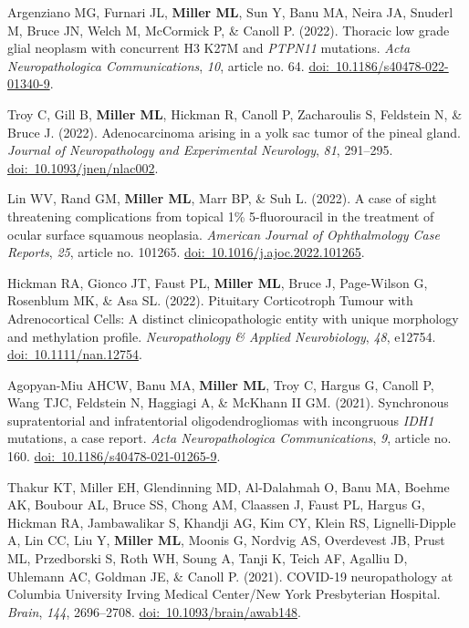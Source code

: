 \documentclass[10pt]{article}
\begin{document}
\begin{description}
\item Argenziano MG, Furnari JL, \textbf{Miller ML}, Sun Y, Banu MA, Neira JA, Snuderl M, Bruce JN, Welch M, McCormick P, \& Canoll P. (2022). Thoracic low grade glial neoplasm with concurrent H3 K27M and \textit{PTPN11} mutations. \textit{Acta Neuropathologica Communications}, \textit{10}, article no. 64. \href{https://doi.org/10.1186/s40478-022-01340-9}{doi:~10.1186/s40478-022-01340-9}.
\item Troy C, Gill B, \textbf{Miller ML}, Hickman R, Canoll P, Zacharoulis S, Feldstein N, \& Bruce J. (2022). Adenocarcinoma arising in a yolk sac tumor of the pineal gland. \textit{Journal of Neuropathology and Experimental Neurology}, \textit{81}, 291--295. \href{http://dx.doi.org/10.1093/jnen/nlac002}{doi:~10.1093/jnen/nlac002}.
\item Lin WV, Rand GM, \textbf{Miller ML}, Marr BP, \& Suh L. (2022). A case of sight threatening complications from topical 1\% 5-fluorouracil in the treatment of ocular surface squamous neoplasia. \textit{American Journal of Ophthalmology Case Reports}, \textit{25}, article no. 101265. \href{https://doi.org/10.1016/j.ajoc.2022.101265}{doi:~10.1016/j.ajoc.2022.101265}.
\item Hickman RA, Gionco JT, Faust PL, \textbf{Miller ML}, Bruce J, Page-Wilson G, Rosenblum MK, \& Asa SL. (2022). Pituitary Corticotroph Tumour with Adrenocortical Cells: A distinct clinicopathologic entity with unique morphology and methylation profile. \textit{Neuropathology \& Applied Neurobiology}, \textit{48}, e12754. \href{https://doi.org/10.1111/nan.12754}{doi:~10.1111/nan.12754}.
\item Agopyan-Miu AHCW, Banu MA, \textbf{Miller ML}, Troy C, Hargus G, Canoll P, Wang TJC, Feldstein N, Haggiagi A, \& McKhann II GM. (2021). Synchronous supratentorial and infratentorial oligodendrogliomas with incongruous \textit{IDH1} mutations, a case report. \textit{Acta Neuropathologica Communications}, \textit{9}, article no. 160. \href{https://doi.org/10.1186/s40478-021-01265-9}{doi:~10.1186/s40478-021-01265-9}.
\item Thakur KT, Miller EH, Glendinning MD, Al-Dalahmah O, Banu MA, Boehme AK, Boubour AL, Bruce SS, Chong AM, Claassen J, Faust PL, Hargus G, Hickman RA, Jambawalikar S, Khandji AG, Kim CY, Klein RS, Lignelli-Dipple A, Lin CC, Liu Y, \textbf{Miller ML}, Moonis G, Nordvig AS, Overdevest JB, Prust ML, Przedborski S, Roth WH, Soung A, Tanji K, Teich AF, Agalliu D, Uhlemann AC, Goldman JE, \& Canoll P. (2021). COVID-19 neuropathology at Columbia University Irving Medical Center/New York Presbyterian Hospital. \textit{Brain}, \textit{144}, 2696--2708. \href{https://doi.org/10.1093/brain/awab148}{doi:~10.1093/brain/awab148}.

\end{description}
\end{document}
